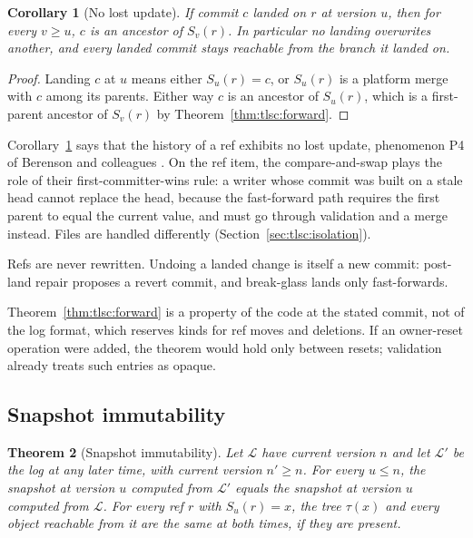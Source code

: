 \documentclass[11pt,letterpaper]{article}
\newtheorem{theorem}{Theorem}[section]
\newtheorem{corollary}[theorem]{Corollary}
\theoremstyle{definition}
\theoremstyle{remark}
\newcommand{\Snap}[1]{S_{#1}}
\newcommand{\Log}{\mathcal{L}}
\newcommand{\tree}{\tau}
\begin{document}
\begin{corollary}[No lost update]
\label{cor:tlsc:nolostupdate}
If commit $c$ landed on $r$ at version $u$, then for every $v\geq u$, $c$ is an ancestor of $\Snap{v}(r)$. In particular no landing overwrites another, and every landed commit stays reachable from the branch it landed on.
\end{corollary}

\begin{proof}
Landing $c$ at $u$ means either $\Snap{u}(r)=c$, or $\Snap{u}(r)$ is a platform merge with $c$ among its parents. Either way $c$ is an ancestor of $\Snap{u}(r)$, which is a first-parent ancestor of $\Snap{v}(r)$ by Theorem~\ref{thm:tlsc:forward}.
\end{proof}

Corollary~\ref{cor:tlsc:nolostupdate} says that the history of a ref exhibits no lost update, phenomenon P4 of Berenson and colleagues \cite{berenson1995critique}. On the ref item, the compare-and-swap plays the role of their first-committer-wins rule: a writer whose commit was built on a stale head cannot replace the head, because the fast-forward path requires the first parent to equal the current value, and must go through validation and a merge instead. Files are handled differently (Section~\ref{sec:tlsc:isolation}).

Refs are never rewritten. Undoing a landed change is itself a new commit: post-land repair proposes a revert commit, and break-glass lands only fast-forwards.

Theorem~\ref{thm:tlsc:forward} is a property of the code at the stated commit, not of the log format, which reserves kinds for ref moves and deletions. If an owner-reset operation were added, the theorem would hold only between resets; validation already treats such entries as opaque.

\subsection{Snapshot immutability}

\begin{theorem}[Snapshot immutability]
\label{thm:tlsc:snapshot-immutability}
Let $\Log$ have current version $n$ and let $\Log'$ be the log at any later time, with current version $n'\geq n$. For every $u\leq n$, the snapshot at version $u$ computed from $\Log'$ equals the snapshot at version $u$ computed from $\Log$. For every ref $r$ with $\Snap{u}(r)=x$, the tree $\tree(x)$ and every object reachable from it are the same at both times, if they are present.
\end{theorem}
\end{document}
